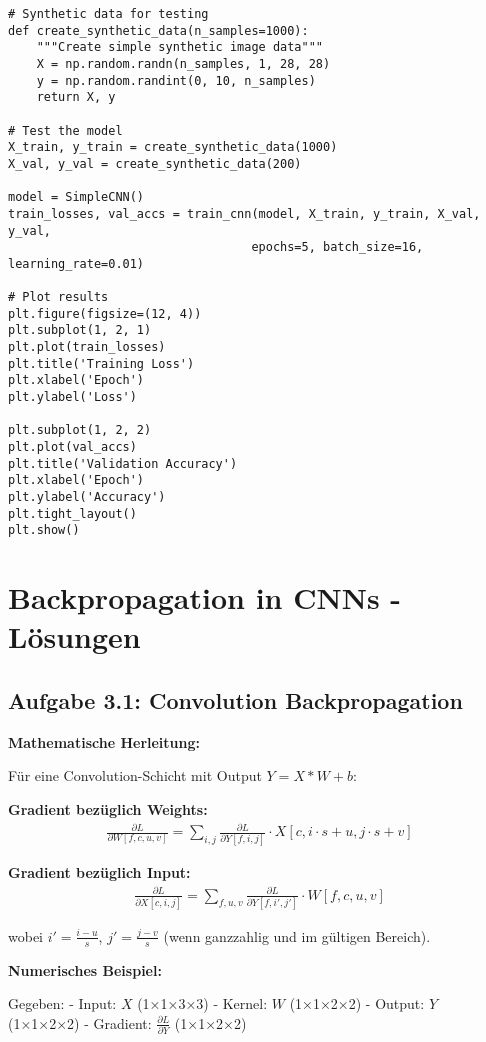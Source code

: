 ﻿\documentclass[12pt,a4paper]{article}
\begin{document}
\begin{lstlisting}
# Synthetic data for testing
def create_synthetic_data(n_samples=1000):
    """Create simple synthetic image data"""
    X = np.random.randn(n_samples, 1, 28, 28)
    y = np.random.randint(0, 10, n_samples)
    return X, y

# Test the model
X_train, y_train = create_synthetic_data(1000)
X_val, y_val = create_synthetic_data(200)

model = SimpleCNN()
train_losses, val_accs = train_cnn(model, X_train, y_train, X_val, y_val, 
                                  epochs=5, batch_size=16, learning_rate=0.01)

# Plot results
plt.figure(figsize=(12, 4))
plt.subplot(1, 2, 1)
plt.plot(train_losses)
plt.title('Training Loss')
plt.xlabel('Epoch')
plt.ylabel('Loss')

plt.subplot(1, 2, 2)
plt.plot(val_accs)
plt.title('Validation Accuracy')
plt.xlabel('Epoch')
plt.ylabel('Accuracy')
plt.tight_layout()
plt.show()
\end{lstlisting}

\section{Backpropagation in CNNs - Lösungen}

\subsection{Aufgabe 3.1: Convolution Backpropagation}

\textbf{Mathematische Herleitung:}

Für eine Convolution-Schicht mit Output $Y = X * W + b$:

\textbf{Gradient bezüglich Weights:}
\begin{align}
\frac{\partial L}{\partial W[f,c,u,v]} = \sum_{i,j} \frac{\partial L}{\partial Y[f,i,j]} \cdot X[c, i \cdot s + u, j \cdot s + v]
\end{align}

\textbf{Gradient bezüglich Input:}
\begin{align}
\frac{\partial L}{\partial X[c,i,j]} = \sum_{f,u,v} \frac{\partial L}{\partial Y[f,i',j']} \cdot W[f,c,u,v]
\end{align}

wobei $i' = \frac{i - u}{s}$, $j' = \frac{j - v}{s}$ (wenn ganzzahlig und im gültigen Bereich).

\textbf{Numerisches Beispiel:}

Gegeben:
- Input: $X$ (1×1×3×3)
- Kernel: $W$ (1×1×2×2)
- Output: $Y$ (1×1×2×2)
- Gradient: $\frac{\partial L}{\partial Y}$ (1×1×2×2)
\end{document}

